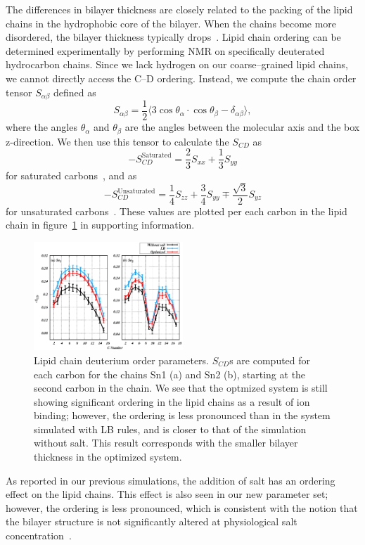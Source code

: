 \documentclass[12pt,openany,final]{book}
\begin{document}
The differences in bilayer thickness are closely related to the
packing of the lipid chains in the hydrophobic core of the bilayer. 
When the chains become more disordered, 
the bilayer thickness typically drops~\cite{nagle:2000}. 
Lipid chain ordering can be determined experimentally by performing NMR 
on specifically deuterated hydrocarbon chains. 
Since we lack hydrogen on our coarse--grained lipid chains, 
we cannot directly access the C--D ordering. 
Instead, we compute the chain order tensor $S_{\alpha\beta}$ defined as
\begin{equation}
    S_{\alpha\beta}=\frac{1}{2}\big\langle
    3\cos{\theta_\alpha}\cdot\cos{\theta_\beta}-\delta_{\alpha\beta}\big\rangle,
    \nonumber
\end{equation}
where the angles $\theta_\alpha$ and $\theta_\beta$ are the angles between the molecular
axis and the box z-direction. 
We then use this tensor to calculate the $S_{CD}$ as
\begin{equation}
    -S_{CD}^{\text{Saturated}}=\frac{2}{3}S_{xx}+\frac{1}{3}S_{yy}
\end{equation}
for saturated carbons~\cite{egberts:1988}, and as
\begin{equation}
-S_{CD}^{\text{Unsaturated}}=\frac{1}{4}S_{zz}+\frac{3}{4}S_{yy}\mp \frac{\sqrt{3}}{2}S_{yz}
\end{equation}
for unsaturated carbons~\cite{Douliez:1995}.  
These values are plotted per each carbon in the lipid chain in figure~\ref{fig:op:ch1} in supporting
information.
\begin{figure}[h!]
    \caption[Acyl-chain order parameters]{ Lipid chain deuterium order parameters. $S_{CD}$s are computed for each carbon
        for the chains Sn1 (a) and Sn2 (b), starting at the second carbon in the chain. We see that the optmized system is still showing significant ordering in the lipid
    chains as a result of ion binding; however, the ordering is less pronounced than in the system simulated with LB rules, 
    and is closer to that of the simulation without salt. This
result corresponds with the smaller bilayer thickness in the optimized system.
}
    \label{fig:op:ch1}
    \includegraphics[width=0.5\textwidth,trim=-0cm 0 0 0]{figure_s2_ch1.eps}
\end{figure}
As reported in our previous simulations, 
the addition of salt has an ordering effect on the lipid chains. 
This effect is also seen in our new parameter set; however, the ordering is less pronounced, 
which is consistent with the notion that the bilayer structure is not significantly altered 
at physiological salt concentration~\cite{pabst:2007,petrache:2006:swelling}.
\end{document}
